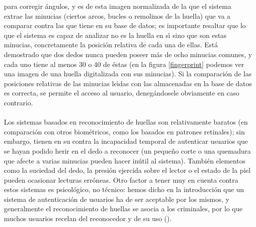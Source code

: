 para corregir \'angulos, y es de
esta imagen normalizada de la que el sistema extrae las minucias (ciertos arcos,
bucles o remolinos de la huella) que va a comparar contra las que tiene en su
base de datos; es importante resaltar que lo que el sistema es capaz de analizar
no es la huella en s\'{\i} sino que son estas minucias, concretamente la 
posici\'on relativa de cada una de ellas. Est\'a demostrado que dos dedos nunca
pueden poseer m\'as de ocho minucias comunes, y cada uno tiene al menos 30 o
40 de \'estas (en la figura \ref{fingerprint} podemos ver una imagen
de una huella digitalizada con sus minucias). Si la comparaci\'on de las 
posiciones relativas de las minucias le\'{\i}das con las almacenadas en la base 
de datos es correcta, se permite el acceso al usuario, deneg\'andosele 
obviamente en caso contrario.\\
\\Los sistemas basados en reconocimiento de huellas son relativamente baratos 
(en comparaci\'on con otros bio\-m\'e\-tri\-cos, como los basados en patrones 
retinales); sin embargo, tienen en su contra la incapacidad temporal de 
autenticar usuarios que se hayan podido herir en el dedo a reconocer (un 
peque\~no corte o una quemadura que afecte a varias minucias pueden hacer
in\'util al sistema). Tambi\'en elementos como la suciedad del dedo, la 
presi\'on ejercida sobre el lector o el estado de la piel pueden ocasionar 
lecturas err\'oneas. Otro factor a tener muy en cuenta contra estos sistemas es
psicol\'ogico, no t\'ecnico: hemos dicho en la introducci\'on que un sistema
de autenticaci\'on de usuarios ha de ser aceptable por los mismos, y 
generalmente el reconocimiento de huellas se asocia a los criminales, por lo que
muchos usuarios recelan del reconocedor y de su uso (\cite{kn:kra97}).
